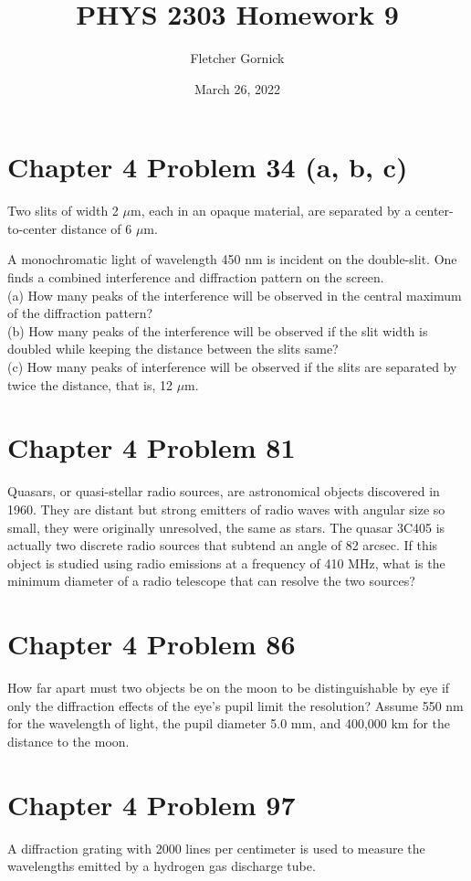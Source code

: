\documentclass[11pt]{article}
\title{\vspace{-1.0cm}PHYS 2303 Homework 9}
\author{Fletcher Gornick}
\date{March 26, 2022}
\begin{document}
 \maketitle
 \section*{Chapter 4 Problem 34 (a, b, c)}
Two slits of width 2 \(\mu\)m, each in an opaque material, are separated by a center-to-center distance 
of 6 \(\mu\)m. 

A monochromatic light of wavelength 450 nm is incident on the double-slit. One finds a combined interference 
and diffraction pattern on the screen. \\

(a) How many peaks of the interference will be observed in the central maximum of the diffraction pattern? \\

(b) How many peaks of the interference will be observed if the slit width is doubled while keeping the 
distance between the slits same? \\

(c) How many peaks of interference will be observed if the slits are separated by twice the distance, 
that is, 12 \(\mu\)m.
 \newpage

 \section*{Chapter 4 Problem 81}
Quasars, or quasi-stellar radio sources, are astronomical objects discovered in 1960. They are distant but 
strong emitters of radio waves with angular size so small, they were originally unresolved, the same as stars. 
The quasar 3C405 is actually two discrete radio sources that subtend an angle of 82 arcsec. If this object is 
studied using radio emissions at a frequency of 410 MHz, what is the minimum diameter of a radio telescope 
that can resolve the two sources?
 \newpage
  
 \section*{Chapter 4 Problem 86}
How far apart must two objects be on the moon to be distinguishable by eye if only the diffraction effects 
of the eye’s pupil limit the resolution? Assume 550 nm for the wavelength of light, the pupil diameter 
5.0 mm, and 400,000 km for the distance to the moon.
 \newpage

 \section*{Chapter 4 Problem 97}
A diffraction grating with 2000 lines per centimeter is used to measure the wavelengths emitted by a hydrogen 
gas discharge tube. \\
\end{document}
